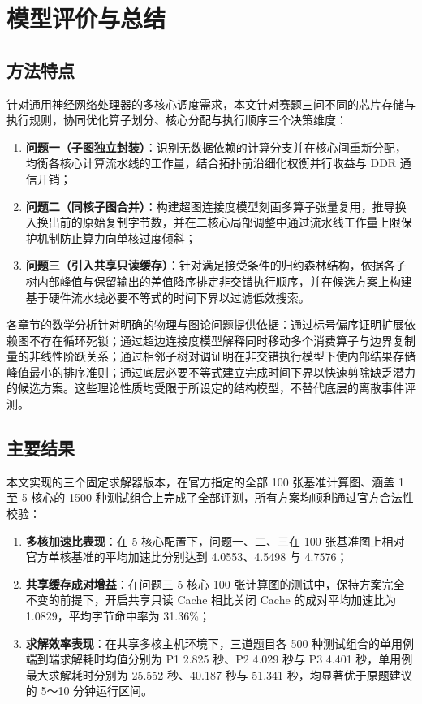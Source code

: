 \documentclass[anonymous,withtoc]{gmcm2026}
\providecommand{\tightlist}{\setlength{\itemsep}{0pt}\setlength{\parskip}{0pt}}
\begin{document}
\section{模型评价与总结}

\subsection{方法特点}

针对通用神经网络处理器的多核心调度需求，本文针对赛题三问不同的芯片存储与执行规则，协同优化算子划分、核心分配与执行顺序三个决策维度：

\begin{enumerate}
\def\labelenumi{\arabic{enumi}.}
\tightlist
\item
  \textbf{问题一（子图独立封装）}：识别无数据依赖的计算分支并在核心间重新分配，均衡各核心计算流水线的工作量，结合拓扑前沿细化权衡并行收益与 DDR 通信开销；
\item
  \textbf{问题二（同核子图合并）}：构建超图连接度模型刻画多算子张量复用，推导换入换出前的原始复制字节数，并在二核心局部调整中通过流水线工作量上限保护机制防止算力向单核过度倾斜；
\item
  \textbf{问题三（引入共享只读缓存）}：针对满足接受条件的归约森林结构，依据各子树内部峰值与保留输出的差值降序排定非交错执行顺序，并在候选方案上构建基于硬件流水线必要不等式的时间下界以过滤低效搜索。
\end{enumerate}

各章节的数学分析针对明确的物理与图论问题提供依据：通过标号偏序证明扩展依赖图不存在循环死锁；通过超边连接度模型解释同时移动多个消费算子与边界复制量的非线性阶跃关系；通过相邻子树对调证明在非交错执行模型下使内部结果存储峰值最小的排序准则；通过底层必要不等式建立完成时间下界以快速剪除缺乏潜力的候选方案。这些理论性质均受限于所设定的结构模型，不替代底层的离散事件评测。

\subsection{主要结果}

本文实现的三个固定求解器版本，在官方指定的全部 100 张基准计算图、涵盖 1 至 5 核心的 1500 种测试组合上完成了全部评测，所有方案均顺利通过官方合法性校验：

\begin{enumerate}
\def\labelenumi{\arabic{enumi}.}
\tightlist
\item
  \textbf{多核加速比表现}：在 5 核心配置下，问题一、二、三在 100 张基准图上相对官方单核基准的平均加速比分别达到 4.0553、4.5498 与 4.7576；
\item
  \textbf{共享缓存成对增益}：在问题三 5 核心 100 张计算图的测试中，保持方案完全不变的前提下，开启共享只读 Cache 相比关闭 Cache 的成对平均加速比为 1.0829，平均字节命中率为 31.36\%；
\item
  \textbf{求解效率表现}：在共享多核主机环境下，三道题目各 500 种测试组合的单用例端到端求解耗时均值分别为 P1 2.825 秒、P2 4.029 秒与 P3 4.401 秒，单用例最大求解耗时分别为 25.552 秒、40.187 秒与 51.341 秒，均显著优于原题建议的 5～10 分钟运行区间。
\end{enumerate}
\end{document}
